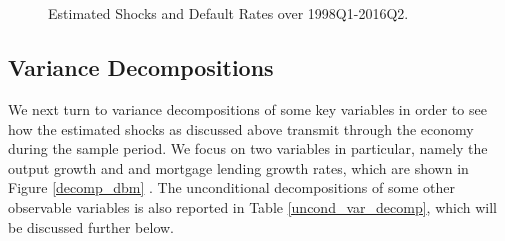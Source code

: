 \documentclass[12pt]{article}
\numberwithin{equation}{section}
\begin{document}
\begin{figure}[H]
\centering
\caption{Estimated Shocks and Default Rates over 1998Q1-2016Q2.}
\label{estimated_shocks}
\\
\\
\end{figure}


\FloatBarrier

\subsection{Variance Decompositions}

We next turn to variance decompositions of some key variables in order to see how the estimated shocks as discussed above transmit through the economy during the sample period. We focus on two variables in particular, namely the output growth and and mortgage lending growth rates, which are shown in Figure \ref{decomp_dbm} . The unconditional decompositions of some other observable variables is also reported in Table \ref{uncond_var_decomp}, which will be discussed further below. 
\end{document}
